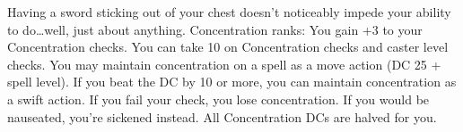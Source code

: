 \skillfeat
{Having a sword sticking out of your chest doesn't noticeably impede your ability to do\ldots well, just about anything.}
{Concentration ranks:}
{You gain +3 to your Concentration checks.}
{You can take 10 on Concentration checks and caster level checks.}
{You may maintain concentration on a spell as a move action (DC 25 + spell level). If you beat the DC by 10 or more, you can maintain concentration as a swift action. If you fail your check, you lose concentration.}
{If you would be nauseated, you're sickened instead.}
{All Concentration DCs are halved for you.}
